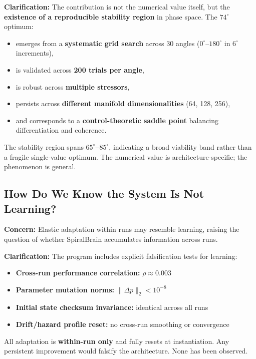 \documentclass[12pt,a4paper]{report}
\begin{document}
\textbf{Clarification:}  
The contribution is not the numerical value itself, but the \textbf{existence of a reproducible stability region} in phase space. The $74^\circ$ optimum:

\begin{itemize}
\item emerges from a \textbf{systematic grid search} across 30 angles ($0^\circ$–$180^\circ$ in $6^\circ$ increments),  
\item is validated across \textbf{200 trials per angle},  
\item is robust across \textbf{multiple stressors},  
\item persists across \textbf{different manifold dimensionalities} (64, 128, 256),  
\item and corresponds to a \textbf{control-theoretic saddle point} balancing differentiation and coherence.
\end{itemize}

The stability region spans \textbf{$65^\circ$–$85^\circ$}, indicating a broad viability band rather than a fragile single-value optimum. The numerical value is architecture-specific; the phenomenon is general.

\subsection{How Do We Know the System Is Not Learning?}

\textbf{Concern:}  
Elastic adaptation within runs may resemble learning, raising the question of whether SpiralBrain accumulates information across runs.

\textbf{Clarification:}  
The program includes explicit falsification tests for learning:

\begin{itemize}
\item \textbf{Cross-run performance correlation:} \( \rho \approx 0.003 \)  
\item \textbf{Parameter mutation norms:} \( \|\Delta p\|_2 < 10^{-8} \)  
\item \textbf{Initial state checksum invariance:} identical across all runs  
\item \textbf{Drift/hazard profile reset:} no cross-run smoothing or convergence  
\end{itemize}

All adaptation is \textbf{within-run only} and fully resets at instantiation. Any persistent improvement would falsify the architecture. None has been observed.
\end{document}
